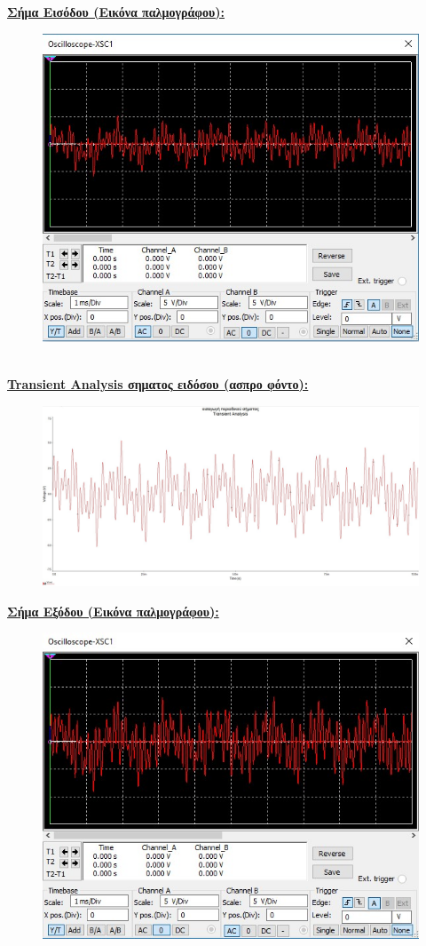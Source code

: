 \documentclass{article}
\begin{document}
{{\clearpage
\textbf{\underline{Σήμα Εισόδου (Εικόνα παλμογράφου):}}
\begin{figure}[h!]
\centering
 	\advance\leftskip-1cm
  \includegraphics[width=120mm,scale=2]{thema3/multisim6.jpg}
\end{figure} \\
\textbf{\underline{Transient Analysis σηματος ειδόσου (ασπρο φόντο):}}
\begin{figure}[h!]
\centering
 	\advance\leftskip-1cm
  \includegraphics[width=120mm,scale=2]{thema3/multisim7.jpg}
\end{figure} 
\clearpage
\textbf{\underline{Σήμα Εξόδου (Εικόνα παλμογράφου):}}
\begin{figure}[h!]
\centering
 	\advance\leftskip-1cm
  \includegraphics[width=120mm,scale=2]{thema3/multisim8.jpg}

\end{figure}}}
\end{document}
